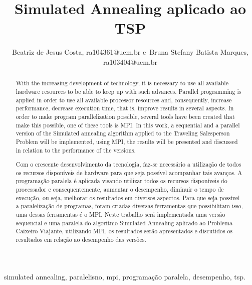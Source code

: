 \documentclass[journal]{IEEEtran}
\begin{document}
\title{Simulated Annealing aplicado ao TSP}


\author{Beatriz de Jesus Costa,
        ra104361@uem.br
        e~Bruna Stefany Batista Marques, ra103404@uem.br
}





\maketitle


\begin{abstract}
With the increasing development of technology, it is necessary to use all available hardware resources to be able to keep up with such advances. Parallel programming is applied in order to use all available processor resources and, consequently, increase performance, decrease execution time, that is, improve results in several aspects. In order to make program parallelization possible, several tools have been created that make this possible, one of these tools is MPI. In this work, a sequential and a parallel version of the Simulated annealing algorithm applied to the Traveling Salesperson Problem will be implemented, using MPI, the results will be presented and discussed in relation to the performance of the versions.
\end{abstract}

\def\abstractname{Resumo}
\begin{abstract}
Com o crescente desenvolvimento da tecnologia, faz-se necessário a utilização de todos os recursos disponíveis de hardware para que seja possível acompanhar tais avanços. A programação paralela é aplicada visando utilizar todos os recursos disponíveis do processador e consequentemente, aumentar o desempenho, diminuir o tempo de execução, ou seja, melhorar os resultados em diversos aspectos. Para que seja possível a paralelização de programas, foram criadas diversas ferramentas que possibilitam isso, uma dessas ferramentas é o MPI. Neste trabalho será implementada uma versão sequencial e uma paralela do algoritmo Simulated Annealing aplicado ao Problema Caixeiro Viajante, utilizando MPI, os resultados serão apresentados e discutidos os resultados em relação ao desempenho das versões.
\end{abstract}


\begin{IEEEkeywords}
  simulated annealing, paralelisno, mpi, programação paralela, desempenho, tsp.
\end{IEEEkeywords}
\end{document}
